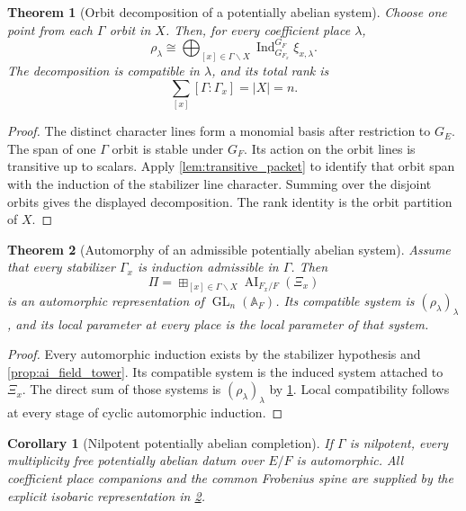 \documentclass{aomart}
\newtheorem{theorem}{Theorem}[section]
\newtheorem{corollary}[corollary]{Corollary}
\theoremstyle{definition}
\theoremstyle{remark}
\newcommand{\GL}{\operatorname{GL}}
\newcommand{\Ind}{\operatorname{Ind}}
\newcommand{\AI}{\operatorname{AI}}
\newcommand{\abs}[1]{\left\lvert#1\right\rvert}
\newcommand{\Adele}{\mathbb A}
\newcommand{\boxplusop}{\mathbin{\boxplus}}
\begin{document}
\begin{theorem}[Orbit decomposition of a potentially abelian system]\label{thm:potential_orbit_decomposition}
Choose one point from each \(\Gamma\) orbit in \(X\). Then, for every coefficient place \(\lambda\),
\[
\boxed{
\rho_\lambda
\cong
\bigoplus_{[x]\in\Gamma\backslash X}
\Ind_{G_{F_x}}^{G_F}\xi_{x,\lambda}.
}
\]
The decomposition is compatible in \(\lambda\), and its total rank is
\[
\sum_{[x]}[\Gamma:\Gamma_x]=\abs X=n.
\]
\end{theorem}

\begin{proof}
The distinct character lines form a monomial basis after restriction to \(G_E\). The span of one \(\Gamma\) orbit is stable under \(G_F\). Its action on the orbit lines is transitive up to scalars. Apply \cref{lem:transitive_packet} to identify that orbit span with the induction of the stabilizer line character. Summing over the disjoint orbits gives the displayed decomposition. The rank identity is the orbit partition of \(X\).
\end{proof}

\begin{theorem}[Automorphy of an admissible potentially abelian system]\label{thm:potential_automorphy}
Assume that every stabilizer \(\Gamma_x\) is induction admissible in \(\Gamma\). Then
\[
\boxed{
\Pi
=
\boxplusop_{[x]\in\Gamma\backslash X}
\AI_{F_x/F}(\Xi_x)
}
\]
is an automorphic representation of \(\GL_n(\Adele_F)\). Its compatible system is \((\rho_\lambda)_\lambda\), and its local parameter at every place is the local parameter of that system.
\end{theorem}

\begin{proof}
Every automorphic induction exists by the stabilizer hypothesis and \cref{prop:ai_field_tower}. Its compatible system is the induced system attached to \(\Xi_x\). The direct sum of those systems is \((\rho_\lambda)_\lambda\) by \cref{thm:potential_orbit_decomposition}. Local compatibility follows at every stage of cyclic automorphic induction.
\end{proof}

\begin{corollary}[Nilpotent potentially abelian completion]\label{cor:nilpotent_potential}
If \(\Gamma\) is nilpotent, every multiplicity free potentially abelian datum over \(E/F\) is automorphic. All coefficient place companions and the common Frobenius spine are supplied by the explicit isobaric representation in \cref{thm:potential_automorphy}.
\end{corollary}
\end{document}

